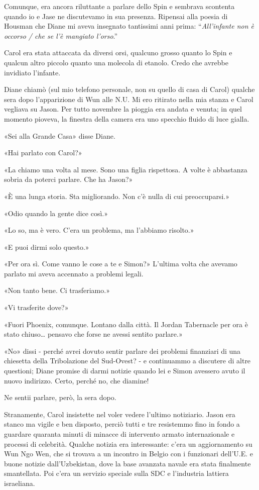 Comunque, era ancora riluttante a parlare dello Spin e sembrava
scontenta quando io e Jase ne discutevamo in sua presenza. Ripensai alla
poesia di Housman che Diane mi aveva insegnato tantissimi anni prima:
``\emph{All'infante non è occorso / che se l'è mangiato l'orso}.''

Carol era stata attaccata da diversi orsi, qualcuno grosso quanto lo
Spin e qualcun altro piccolo quanto una molecola di etanolo. Credo che
avrebbe invidiato l'infante.

\separatorefiori

Diane chiamò (sul mio telefono personale, non su quello di casa di
Carol) qualche sera dopo l'apparizione di Wun alle N.U. Mi ero ritirato
nella mia stanza e Carol vegliava su Jason. Per tutto novembre la
pioggia era andata e venuta; in quel momento pioveva, la finestra della
camera era uno specchio fluido di luce gialla.

«Sei alla Grande Casa» disse Diane.

«Hai parlato con Carol?»

«La chiamo una volta al mese. Sono una figlia rispettosa. A volte è
abbastanza sobria da poterci parlare. Che ha Jason?»

«È una lunga storia. Sta migliorando. Non c'è nulla di cui
preoccuparsi.»

«Odio quando la gente dice così.»

«Lo so, ma è vero. C'era un problema, ma l'abbiamo risolto.»

«E puoi dirmi solo questo.»

«Per ora sì. Come vanno le cose a te e Simon?» L'ultima volta che
avevamo parlato mi aveva accennato a problemi legali.

«Non tanto bene. Ci trasferiamo.»

«Vi trasferite dove?»

«Fuori Phoenix, comunque. Lontano dalla città. Il Jordan Tabernacle per
ora è stato chiuso\ldots{} pensavo che forse ne avessi sentito parlare.»

«No» dissi - perché avrei dovuto sentir parlare dei problemi finanziari
di una chiesetta della Tribolazione del Sud-Ovest? - e continuammo a
discutere di altre questioni; Diane promise di darmi notizie quando lei
e Simon avessero avuto il nuovo indirizzo. Certo, perché no, che
diamine!

Ne sentii parlare, però, la sera dopo.

Stranamente, Carol insistette nel voler vedere l'ultimo notiziario.
Jason era stanco ma vigile e ben disposto, perciò tutti e tre resistemmo
fino in fondo a guardare quaranta minuti di minacce di intervento armato
internazionale e processi di celebrità. Qualche notizia era
interessante: c'era un aggiornamento su Wun Ngo Wen, che si trovava a un
incontro in Belgio con i funzionari dell'U.E. e buone notizie
dall'Uzbekistan, dove la base avanzata navale era stata finalmente
smantellata. Poi c'era un servizio speciale sulla SDC e l'industria
lattiera israeliana.

